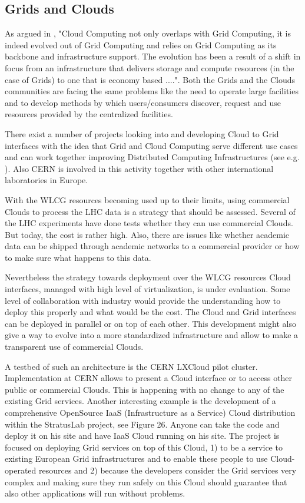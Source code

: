\subsection{Grids and Clouds}

As argued in \cite{Cloud}, "Cloud Computing not only overlaps with Grid
Computing, it is indeed evolved out of Grid Computing and relies on
Grid Computing as its backbone and infrastructure support. The
evolution has been a result of a shift in focus from an
infrastructure that delivers storage and compute resources (in the
case of Grids) to one that is economy based ....". Both the Grids
and the Clouds communities are facing the same problems like the
need to operate large facilities and to develop  methods by which
users/consumers discover, request and use resources provided by the
centralized facilities.

There exist a number of projects looking into and developing Cloud
to Grid interfaces with the idea that Grid and Cloud Computing serve
different use cases and can work together improving Distributed
Computing Infrastructures (see e.g. \cite{Cloud,  Cloud2}). Also CERN is involved
in this activity together with other international laboratories in
Europe.

With the WLCG resources becoming used up to their limits, using
commercial Clouds to process the LHC data is a strategy that should
be assessed. Several of the LHC experiments have done tests whether
they can use commercial Clouds. But today, the cost is rather high.
Also, there are issues like whether academic data can be shipped
through academic networks to a commercial provider or how to make sure
what happens to this data.

Nevertheless the strategy towards deployment over the WLCG resources
Cloud interfaces, managed with high level of virtualization, is
under evaluation. Some level of collaboration with industry would
provide the understanding how to deploy this properly and what would
be the cost. The Cloud and Grid interfaces can be deployed in
parallel or on top of each other. This development might also give a
way to evolve into a more standardized infrastructure and allow to
make a transparent use of commercial Clouds.

A testbed of such an architecture is the CERN LXCloud \cite{LXCLOUD} pilot
cluster. Implementation at CERN allows to present a Cloud interface
or to access other public or commercial Clouds. This is happening
with no change to any of the existing Grid services. Another
interesting example is the development of a comprehensive OpenSource
IaaS (Infrastructure as a Service) Cloud distribution within the
StratusLab project, see Figure 26. Anyone can take the code and
deploy it on his site and have IaaS Cloud running on his site. The
project is focused on deploying Grid services on top of this Cloud,
1) to be a service to existing European Grid infrastructures and to
enable these people to use Cloud-operated resources and 2) because
the developers consider the Grid services very complex and making
sure they run safely on this Cloud should guarantee that also other
applications will run without problems.


